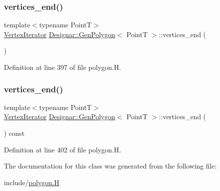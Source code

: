 \subsubsection{\texorpdfstring{vertices\+\_\+end()}{vertices\_end()}\hspace{0.1cm}{\footnotesize\ttfamily [1/2]}}
{\footnotesize\ttfamily template$<$typename PointT$>$ \\
\hyperlink{class_designar_1_1_gen_polygon_1_1_vertex_iterator}{Vertex\+Iterator} \hyperlink{class_designar_1_1_gen_polygon}{Designar\+::\+Gen\+Polygon}$<$ PointT $>$\+::vertices\+\_\+end (\begin{DoxyParamCaption}{ }\end{DoxyParamCaption})\hspace{0.3cm}{\ttfamily [inline]}}



Definition at line 397 of file polygon.\+H.

\mbox{\label{class_designar_1_1_gen_polygon_ad409613d032d91895921d60e27250a14}} 
\subsubsection{\texorpdfstring{vertices\+\_\+end()}{vertices\_end()}\hspace{0.1cm}{\footnotesize\ttfamily [2/2]}}
{\footnotesize\ttfamily template$<$typename PointT$>$ \\
\hyperlink{class_designar_1_1_gen_polygon_1_1_vertex_iterator}{Vertex\+Iterator} \hyperlink{class_designar_1_1_gen_polygon}{Designar\+::\+Gen\+Polygon}$<$ PointT $>$\+::vertices\+\_\+end (\begin{DoxyParamCaption}{ }\end{DoxyParamCaption}) const\hspace{0.3cm}{\ttfamily [inline]}}



Definition at line 402 of file polygon.\+H.



The documentation for this class was generated from the following file\+:\begin{DoxyCompactItemize}
\item 
include/\hyperlink{polygon_8_h}{polygon.\+H}\end{DoxyCompactItemize}
